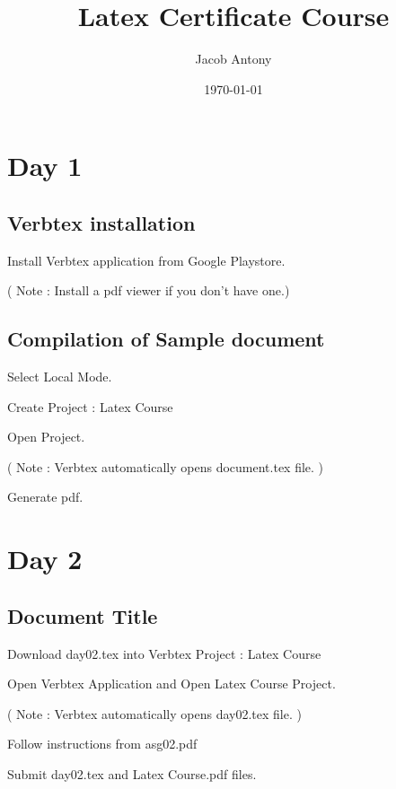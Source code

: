 \documentclass{article}
\title{Latex Certificate Course}
\author{Jacob Antony}
\date{\today}
\begin{document}
\maketitle

\section{Day 1}

\subsection{Verbtex installation}

Install Verbtex application from Google Playstore.

( Note : Install a pdf viewer if you don't have one.)

\subsection{Compilation of Sample document}

Select Local Mode.

Create Project : Latex Course

Open Project.

( Note : Verbtex automatically opens document.tex file. )

Generate pdf.

\section{Day 2}

\subsection{Document Title}

Download day02.tex into Verbtex Project : Latex Course

Open Verbtex Application and Open Latex Course Project.

( Note : Verbtex automatically opens day02.tex file. )

Follow instructions from asg02.pdf

Submit day02.tex and Latex Course.pdf files.

%
%
\end{document}
